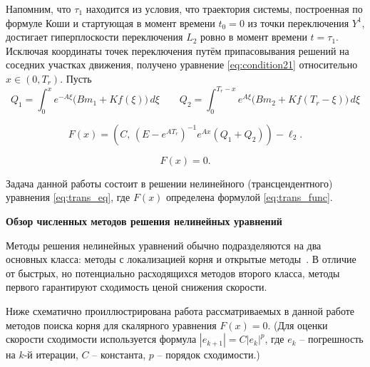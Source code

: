 \documentclass[12pt,a4paper]{article}
\theoremstyle{bigplain}
\theoremstyle{plain}
\begin{document}
Напомним, что $\tau_1$ находится из условия,
что траектория системы,
построенная по формуле Коши и стартующая в момент времени $t_0=0$
из точки переключения $Y^{1}$,
достигает гиперплоскости переключения $L_2$
ровно в момент времени $t=\tau_1$.
Исключая координаты точек переключения
путём припасовывания решений на соседних участках движения,
получено уравнение \eqref{eq:condition21}
относительно $x\in(0,T_r)$. Пусть
\begin{equation*}
    Q_1 = \int_0^{x} e^{-A\xi}\bigl(Bm_1+Kf(\xi)\bigr)\,d\xi \qquad
    Q_2 = \int_0^{T_r-x} e^{A\xi}\bigl(Bm_2+Kf(T_r-\xi)\bigr)\,d\xi
\end{equation*}

\vspace{-15pt}
\noindent
\begin{minipage}[t]{0.65\textwidth}
\begin{equation}
\tag{3}\label{eq:trans_func}
F(x)=
\left(
C,\,
(E-e^{AT_r})^{-1} e^{Ax}
\left(
Q_1+Q_2
\right)
\right)
-\ell_2.
\end{equation}
\end{minipage}\hfill
\begin{minipage}[t]{0.34\textwidth}
\begin{equation}
\tag{3.1}\label{eq:trans_eq}
F(x)=0.
\end{equation}
\end{minipage}

\vspace{15pt}
Задача данной работы состоит в решении нелинейного (трансцендентного) уравнения \eqref{eq:trans_eq}, где $F(x)$ определена формулой \eqref{eq:trans_func}.

\vspace{5pt}
\noindent\textbf{Обзор численных методов решения нелинейных уравнений}

Методы решения нелинейных уравнений
обычно подразделяются на два основных класса: методы с локализацией корня и открытые методы~\cite{Press, Badr}.
В отличие от быстрых, но потенциально расходящихся методов второго
класса, методы первого гарантируют сходимость ценой снижения скорости.

Ниже схематично проиллюстрирована работа рассматриваемых в данной
работе методов поиска корня для скалярного уравнения $F(x)=0$.
(Для оценки скорости сходимости используется формула $|e_{k+1}| = C|e_k|^p$, где $e_k$ -- погрешность на $k$-й итерации, $C$ -- константа, $p$ -- порядок сходимости.)
\end{document}
